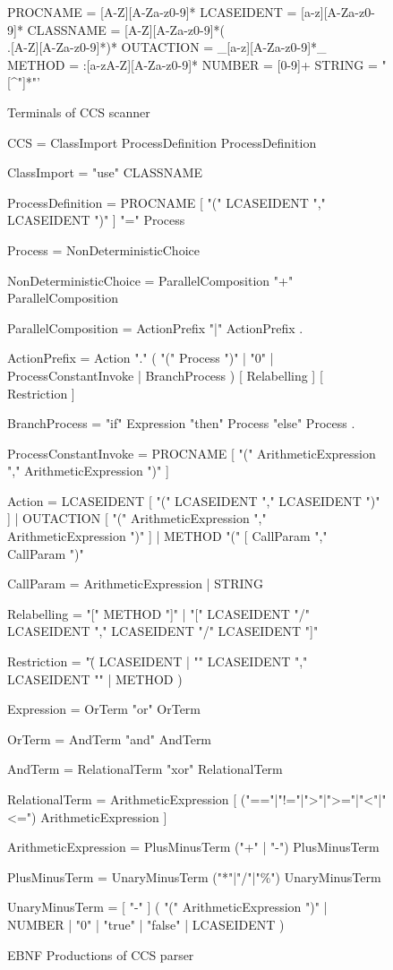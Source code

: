 	\begin{figure}
	
\begin{codeblock}
  PROCNAME   = [A-Z][A-Za-z0-9]*
  LCASEIDENT = [a-z][A-Za-z0-9]*
  CLASSNAME  = [A-Z][A-Za-z0-9]*(\\.[A-Z][A-Za-z0-9]*)*
  OUTACTION  = _[a-z][A-Za-z0-9]*_
  METHOD     = :[a-zA-Z][A-Za-z0-9]*
  NUMBER     = [0-9]+
  STRING     = "[^"]*"'
  \end{codeblock}
  \caption{Terminals of CCS scanner}
  \label{fig:ccs_terminals}  
	\end{figure}
	
	\begin{figure}
\begin{codeblock}
CCS = { ClassImport } ProcessDefinition { ProcessDefinition } 

ClassImport = "use" CLASSNAME 

ProcessDefinition = 
  PROCNAME [ "(" LCASEIDENT {"," LCASEIDENT } ")" ] "=" Process 

Process = NonDeterministicChoice

NonDeterministicChoice = ParallelComposition { "+" ParallelComposition }

ParallelComposition = ActionPrefix { "|" ActionPrefix } .

ActionPrefix =
  { Action "." }
  (
    "(" Process ")"
    | "0"
    | ProcessConstantInvoke
    | BranchProcess
  )
  [ Relabelling ]
  [ Restriction ]

BranchProcess = "if" Expression "then" Process "else" Process .

ProcessConstantInvoke = 
  PROCNAME [ "(" ArithmeticExpression {"," ArithmeticExpression } ")" ]

Action =
  LCASEIDENT [ "(" LCASEIDENT { "," LCASEIDENT } ")" ]
  | OUTACTION [ "(" ArithmeticExpression { "," ArithmeticExpression } ")" ]
  | METHOD "(" [ CallParam { "," CallParam } ")"

CallParam = ArithmeticExpression | STRING

Relabelling =
  "[" METHOD "]"
  | "[" LCASEIDENT "/" LCASEIDENT { "," LCASEIDENT "/" LCASEIDENT } "]"

Restriction = 
  "\" 
  (
    LCASEIDENT 
    | "{" LCASEIDENT {"," LCASEIDENT } "}"
    | METHOD
  )        

Expression = OrTerm { "or" OrTerm }

OrTerm = AndTerm { "and" AndTerm }

AndTerm = RelationalTerm { "xor" RelationalTerm }

RelationalTerm = 
  ArithmeticExpression [ ("=="|"!="|">"|">="|"<"|"<=") ArithmeticExpression ]
		
ArithmeticExpression = PlusMinusTerm { ("+" | "-") PlusMinusTerm }

PlusMinusTerm = UnaryMinusTerm { ("*"|"/"|"\%") UnaryMinusTerm }

UnaryMinusTerm =
  [ "-" ]                                   
  (
    "(" ArithmeticExpression ")"
    | NUMBER 
    | "0"
    | "true"
    | "false"
    | LCASEIDENT
  )
	\end{codeblock}
	\caption{EBNF Productions of CCS parser}\label{fig:ccs_ebnf}
	\end{figure}
	
